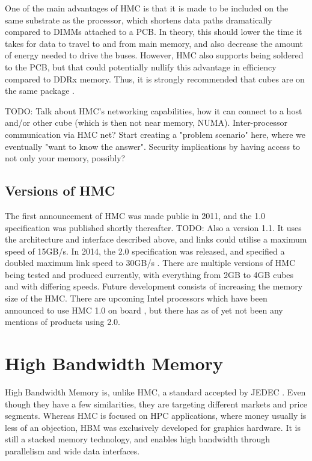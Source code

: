 One of the main advantages of HMC is that it is made to be included on the same substrate as the processor, which shortens data paths dramatically compared to DIMMs attached to a PCB. In theory, this should lower the time it takes for data to travel to and from main memory, and also decrease the amount of energy needed to drive the buses. However, HMC also supports being soldered to the PCB, but that could potentially nullify this advantage in efficiency compared to DDRx memory. Thus, it is strongly recommended that cubes are on the same package \cite{hybrid2013hybrid}.
\bigskip

TODO: Talk about HMC's networking capabilities, how it can connect to a host and/or other cube (which is then not near memory, NUMA). Inter-processor communication via HMC net? Start creating a "problem scenario" here, where we eventually "want to know the answer". Security implications by having access to not only your memory, possibly?

\subsection{Versions of HMC}
The first announcement of HMC was made public in 2011, and the 1.0 specification was published shortly thereafter. TODO: Also a version 1.1. It uses the architecture and interface described above, and links could utilise a maximum speed of 15GB/s. In 2014, the 2.0 specification was released, and specified a doubled maximum link speed to 30GB/s \cite{hybrid2014hybrid}. There are multiple versions of HMC being tested and produced currently, with everything from 2GB to 4GB cubes and with differing speeds. Future development consists of increasing the memory size of the HMC. There are upcoming Intel processors which have been announced to use HMC 1.0 on board \cite{micron2014ikl}, but there has as of yet not been any mentions of products using 2.0. 


\section{High Bandwidth Memory}
High Bandwidth Memory is, unlike HMC, a standard accepted by JEDEC \cite{standard2013high}. Even though they have a few similarities, they are targeting different markets and price segments. Whereas HMC is focused on HPC applications, where money usually is less of an objection, HBM was exclusively developed for graphics hardware. It is still a stacked memory technology, and enables high bandwidth through parallelism and wide data interfaces.

